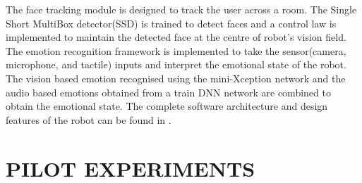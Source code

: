 \documentclass[letterpaper, 10 pt, conference]{ieeeconf}  %
\begin{document}
The face tracking module is designed to track the user across a room. The Single Short MultiBox detector(SSD) is trained to detect faces and a control law is implemented to maintain the detected face at the centre of robot's vision field. The emotion recognition framework is implemented to take the sensor(camera, microphone, and tactile) inputs and interpret the emotional state of the robot. The vision based emotion recognised using the mini-Xception network and the audio based emotions obtained from a train DNN network are combined to obtain the emotional state. The complete software architecture and design features of the robot can be found in \cite{r4}. 




\section{PILOT EXPERIMENTS}
\end{document}
